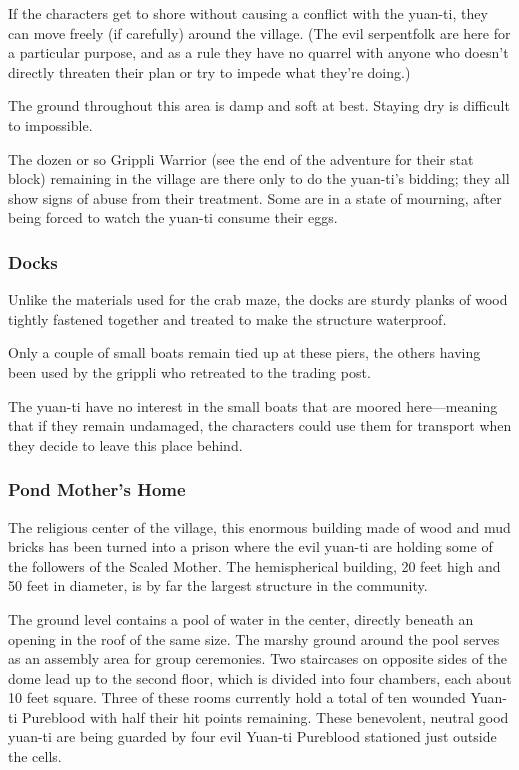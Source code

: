 \documentclass[10pt,a4paper,twoside,bg=print,twocolumn,openany,nodeprecatedcode]{dndbook}
\begin{document}
If the characters get to shore without causing a conflict with the yuan-ti, they can move freely (if carefully) around the village. (The evil serpentfolk are here for a particular purpose, and as a rule they have no quarrel with anyone who doesn't directly threaten their plan or try to impede what they're doing.)

The ground throughout this area is damp and soft at best. Staying dry is difficult to impossible.

The dozen or so Grippli Warrior (see the end of the adventure for their stat block) remaining in the village are there only to do the yuan-ti's bidding; they all show signs of abuse from their treatment. Some are in a state of mourning, after being forced to watch the yuan-ti consume their eggs.

\subsubsection{Docks}
Unlike the materials used for the crab maze, the docks are sturdy planks of wood tightly fastened together and treated to make the structure waterproof.

Only a couple of small boats remain tied up at these piers, the others having been used by the grippli who retreated to the trading post.

The yuan-ti have no interest in the small boats that are moored here—meaning that if they remain undamaged, the characters could use them for transport when they decide to leave this place behind.

\subsubsection{Pond Mother's Home}
The religious center of the village, this enormous building made of wood and mud bricks has been turned into a prison where the evil yuan-ti are holding some of the followers of the Scaled Mother. The hemispherical building, 20 feet high and 50 feet in diameter, is by far the largest structure in the community.

The ground level contains a pool of water in the center, directly beneath an opening in the roof of the same size. The marshy ground around the pool serves as an assembly area for group ceremonies. Two staircases on opposite sides of the dome lead up to the second floor, which is divided into four chambers, each about 10 feet square. Three of these rooms currently hold a total of ten wounded Yuan-ti Pureblood with half their hit points remaining. These benevolent, neutral good yuan-ti are being guarded by four evil Yuan-ti Pureblood stationed just outside the cells.
\end{document}
